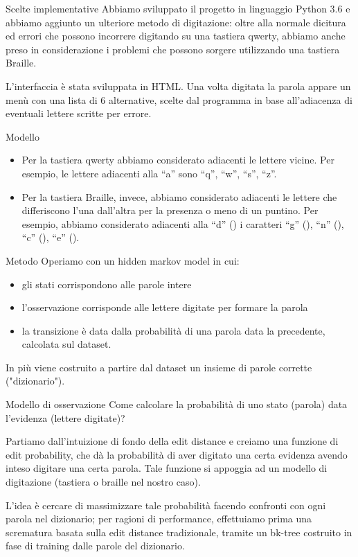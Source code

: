 \documentclass{beamer}
\begin{document}
\begin{frame}{Scelte implementative}
Abbiamo sviluppato il progetto in linguaggio Python 3.6 e abbiamo aggiunto un ulteriore metodo di digitazione: oltre alla normale dicitura ed errori 
che possono incorrere digitando su una tastiera qwerty, abbiamo anche preso in considerazione i problemi che possono sorgere utilizzando una tastiera 
Braille.

L’interfaccia è stata sviluppata in HTML. Una volta digitata la parola appare un menù con una lista di 6 alternative, scelte dal programma in base 
all’adiacenza di eventuali lettere scritte per errore.
\end{frame}
\begin{frame}{Modello}
\begin{itemize}
 \item Per la tastiera qwerty abbiamo considerato adiacenti le lettere vicine. Per esempio, le lettere adiacenti alla “a” sono “q”, “w”, “s”, “z”.
 \item Per la tastiera Braille, invece, abbiamo considerato adiacenti le lettere che differiscono l’una dall’altra per la presenza o meno di un 
puntino. Per esempio, abbiamo considerato adiacenti alla “d” () i caratteri “g” (), “n” (),  “c” (), “e” 
().
\end{itemize}
\end{frame}

\begin{frame}{Metodo}
 Operiamo con un hidden markov model in cui:
 \begin{itemize}
  \item gli stati corrispondono alle parole intere
  \item l'osservazione corrisponde alle lettere digitate per formare la parola
  \item la transizione è data dalla probabilità di una parola data la precedente, calcolata sul dataset.
 \end{itemize}
 In più viene costruito a partire dal dataset un insieme di parole corrette ("dizionario").
\end{frame}

\begin{frame}{Modello di osservazione}
 Come calcolare la probabilità di uno stato (parola) data l'evidenza (lettere digitate)?
 
 Partiamo dall'intuizione di fondo della edit distance e creiamo una funzione di edit probability, che dà la probabilità di aver digitato una certa 
evidenza avendo inteso digitare una certa parola. Tale funzione si appoggia ad un modello di digitazione (tastiera o braille nel nostro caso).
 
 L'idea è cercare di massimizzare tale probabilità facendo confronti con ogni parola nel dizionario; per ragioni di performance, effettuiamo prima una 
scrematura basata sulla edit distance tradizionale, tramite un bk-tree costruito in fase di training dalle parole del dizionario.
\end{frame}
\end{document}
